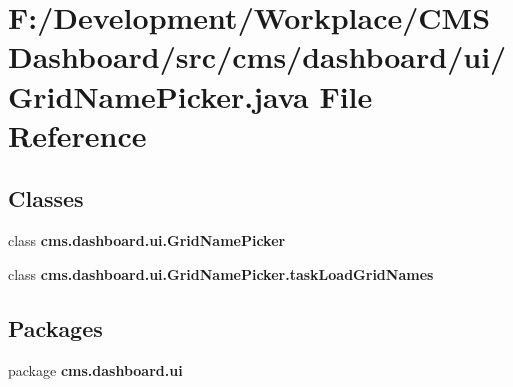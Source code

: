 \section{\-F\-:/\-Development/\-Workplace/\-C\-M\-S \-Dashboard/src/cms/dashboard/ui/\-Grid\-Name\-Picker.java \-File \-Reference}
\label{_grid_name_picker_8java}
\subsection*{\-Classes}
\begin{DoxyCompactItemize}
\item 
class {\bf cms.\-dashboard.\-ui.\-Grid\-Name\-Picker}
\item 
class {\bf cms.\-dashboard.\-ui.\-Grid\-Name\-Picker.\-task\-Load\-Grid\-Names}
\end{DoxyCompactItemize}
\subsection*{\-Packages}
\begin{DoxyCompactItemize}
\item 
package {\bf cms.\-dashboard.\-ui}
\end{DoxyCompactItemize}

